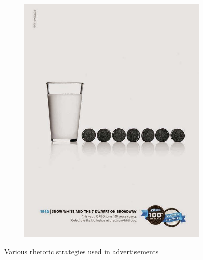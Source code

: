 \begin{figure}
\begin{subfigure}[b]{0.12\textwidth}
         \includegraphics[width=\textwidth,scale=0.68]{images/Oreo_SnowWhite.jpeg}
         \caption{}
         \label{fig:oreo}
     \end{subfigure}
     
     
    \caption{Various rhetoric strategies used in advertisements}
    \label{fig:rhetoric-strategies-ads}
\end{figure}




